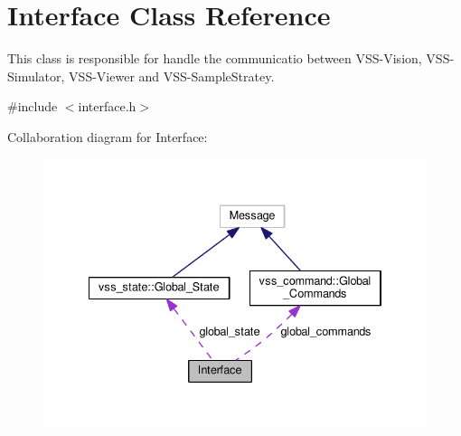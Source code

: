 \hypertarget{classInterface}{}\section{Interface Class Reference}
\label{classInterface}


This class is responsible for handle the communicatio between V\+S\+S-\/\+Vision, V\+S\+S-\/\+Simulator, V\+S\+S-\/\+Viewer and V\+S\+S-\/\+Sample\+Stratey.  




{\ttfamily \#include $<$interface.\+h$>$}



Collaboration diagram for Interface\+:\nopagebreak
\begin{figure}[H]
\begin{center}
\leavevmode
\includegraphics[width=334pt]{classInterface__coll__graph}
\end{center}
\end{figure}

